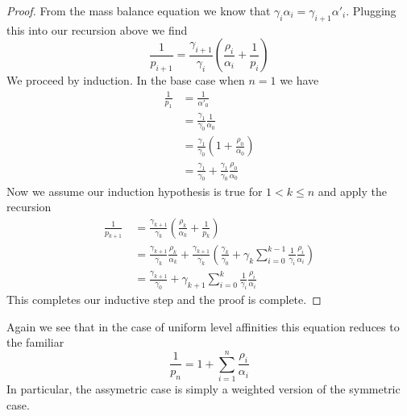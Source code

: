 \documentclass{article}
\begin{document}
\begin{proof}
    From the mass balance equation we know that $\gamma_i \alpha_i = \gamma_{i+1}\alpha'_i$.
    Plugging this into our recursion above we find 
    \[ \frac{1}{p_{i+1}} 
    = \frac{\gamma_{i+1}}{\gamma_i} \left(\frac{\rho_i}{\alpha_i} + \frac{1}{p_i}\right)\]
    We proceed by induction. In the base case when $n=1$ we have 
    \begin{align*}
        \frac{1}{p_1} &= \frac{1}{\alpha'_0} \\
        &= \frac{\gamma_1}{\gamma_0}\frac{1}{\alpha_0} \\
        &= \frac{\gamma_1}{\gamma_0}\left(1+\frac{\rho_0}{\alpha_0}\right) \\
        &= \frac{\gamma_1}{\gamma_0} + \frac{\gamma_1}{\gamma_0}\frac{\rho_0}{\alpha_0}
    \end{align*}
    Now we assume our induction hypothesis is true for $1 < k \leq n$ and apply
    the recursion
    \begin{align*}
    \frac{1}{p_{k+1}}\
    &= \frac{\gamma_{k+1}}{\gamma_k}\left(\frac{\rho_k}{\alpha_k}+\frac{1}{p_k}\right) \\
    &= \frac{\gamma_{k+1}}{\gamma_k}\frac{\rho_k}{\alpha_k} + 
    \frac{\gamma_{k+1}}{\gamma_k}
    \left(\frac{\gamma_k}{\gamma_0}+\gamma_k\sum_{i=0}^{k-1}\frac{1}{\gamma_i}\frac{\rho_i}{\alpha_i}\right) \\
    &= \frac{\gamma_{k+1}}{\gamma_0} + \gamma_{k+1}\sum_{i=0}^k \frac{1}{\gamma_i}\frac{\rho_i}{\alpha_i}
    \end{align*}
    This completes our inductive step and the proof is complete.
\end{proof}
Again we see that in the case of uniform level affinities this equation reduces
to the familiar \[ \frac{1}{p_n} = 1+\sum_{i=1}^n \frac{\rho_i}{\alpha_i}\] 
In particular, the assymetric case is simply a weighted version of the symmetric
case.
\end{document}
